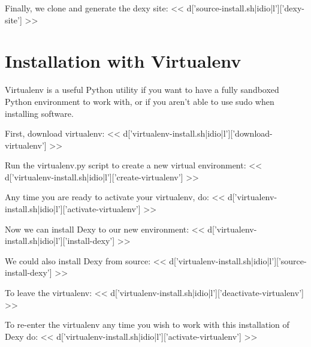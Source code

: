 \documentclass{tufte-handout}
\begin{document}
Finally, we clone and generate the dexy site:
<< d['source-install.sh|idio|l']['dexy-site'] >>

\section{Installation with Virtualenv}

Virtualenv is a useful Python utility if you want to have a fully sandboxed Python environment to work with, or if you aren't able to use sudo when installing software.

First, download virtualenv:
<< d['virtualenv-install.sh|idio|l']['download-virtualenv'] >>

Run the virtualenv.py script to create a new virtual environment:
<< d['virtualenv-install.sh|idio|l']['create-virtualenv'] >>

Any time you are ready to activate your virtualenv, do:
<< d['virtualenv-install.sh|idio|l']['activate-virtualenv'] >>

Now we can install Dexy to our new environment:
<< d['virtualenv-install.sh|idio|l']['install-dexy'] >>

We could also install Dexy from source:
<< d['virtualenv-install.sh|idio|l']['source-install-dexy'] >>

To leave the virtualenv:
<< d['virtualenv-install.sh|idio|l']['deactivate-virtualenv'] >>

To re-enter the virtualenv any time you wish to work with this installation of Dexy do:
<< d['virtualenv-install.sh|idio|l']['activate-virtualenv'] >>
\end{document}
